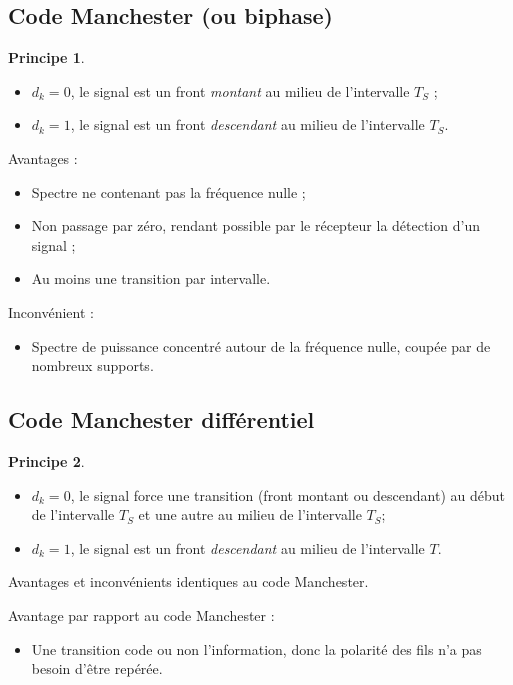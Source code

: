 \documentclass[11pt,english,french]{scrreprt}
\theoremstyle{remark}
\theoremstyle{definition}
\newtheorem*{princ*}{Principe}
\begin{document}
\subsection{Code Manchester (ou biphase)} %
\begin{princ*}\hfill
	\begin{itemize}
		\item $d_k=0$, le signal est un front \emph{montant} au milieu de l'intervalle $T_S$ ;
		\item $d_k = 1$, le signal est un front \emph{descendant} au milieu de l'intervalle $T_S$.
	\end{itemize}
\end{princ*}

Avantages :\begin{itemize}
	\item Spectre ne contenant pas la fréquence nulle ;
	\item Non passage par zéro, rendant possible par le récepteur la détection d'un signal ;
	\item Au moins une transition par intervalle.
\end{itemize}
	          
Inconvénient :\begin{itemize}
	\item Spectre de puissance concentré autour de la fréquence nulle, coupée par de nombreux supports.
\end{itemize}

\subsection{Code Manchester différentiel} %
\begin{princ*}\hfill
	\begin{itemize}
		\item $d_k=0$, le signal force une transition (front montant ou descendant) au début de l'intervalle $T_S$ et une autre au milieu de l'intervalle $T_S$;
		\item $d_k = 1$, le signal est un front \emph{descendant} au milieu de l'intervalle $T$.
	\end{itemize}
\end{princ*}

Avantages et inconvénients identiques au code Manchester.

Avantage par rapport au code Manchester :\begin{itemize}
	\item Une transition code ou non l'information, donc la polarité des fils n'a pas besoin d'être repérée.
\end{itemize}
\end{document}
